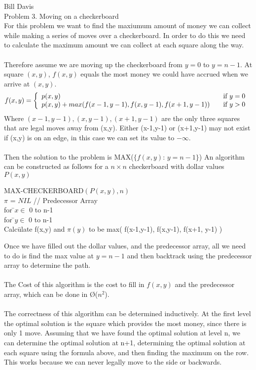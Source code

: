 \documentclass[11pt,fleqn]{article}
\begin{document}
\pagebreak
Bill Davis\\
Problem 3. Moving on a checkerboard \\
For this problem we want to find the maxiumum amount of money we can collect while making a series of moves over a checkerboard. In order to do this we need to calculate the maximum amount we can collect at each square along the way. \\
\\
Therefore assume we are moving up the checkerboard from $y=0$ to $y=n-1$. 
At square $(x,y)$, $f(x,y)$ equals the most money we could have accrued when we arrive at $(x,y)$. 
\[
f(x,y) = \left\{ 
\begin{array}{l l}
  p(x,y) & \quad \mbox{if $y=0$ }\\
  p(x,y) + max( f(x-1,y-1), f(x,y-1), f(x+1, y-1) ) & \quad \mbox{if $y>0$}\\ \end{array} \right. 
\]
Where $(x-1,y-1), (x, y-1), (x+1,y-1)$ are the only three squares that are legal moves away from (x,y). Either (x-1,y-1) or (x+1,y-1) may not exist if (x,y) is on an edge, in this case we can set its value to $-\infty$. \\
\\
Then the solution to the problem is MAX($\{f(x,y) :\, y=n-1\}$) An algorithm can be constructed as follows for a $n\times n$ checkerboard with dollar values $P(x,y)$ 
\begin{tabbing}
MAX-CHECKERBOARD$(P(x,y), n)$\\
$\pi$ = $NIL$ // Predecessor  Array\\
for \=$x \in$ 0 to n-1  \\
\> for \=$y \in$ 0 to n-1 \\
\>  \> Calc\=ulate f(x,y) and $\pi(y)$ to be  max( f(x-1,y-1), f(x,y-1), f(x+1, y-1) )  \\

\end{tabbing} 
Once we have filled out the dollar values, and the predecessor array, all we need to do is find the max value at $y=n-1$ and then backtrack using the predecessor  array to determine the path. \\
\\
The Cost of this algorithm is the cost to fill in $f(x,y)$ and the predecessor  array, which can be done in \O($n^{2}$). \\
\\
The correctness of this algorithm can be determined inductively. At the first level the optimal solution is the square which provides the most money, since there is only 1 move. Assuming that we have found the optimal solution at level n, we can determine the optimal solution at n+1, determining the optimal solution at each square using the formula above, and then finding the maximum on the row. This works because we can never legally move to the side or backwards. 
\end{document}
